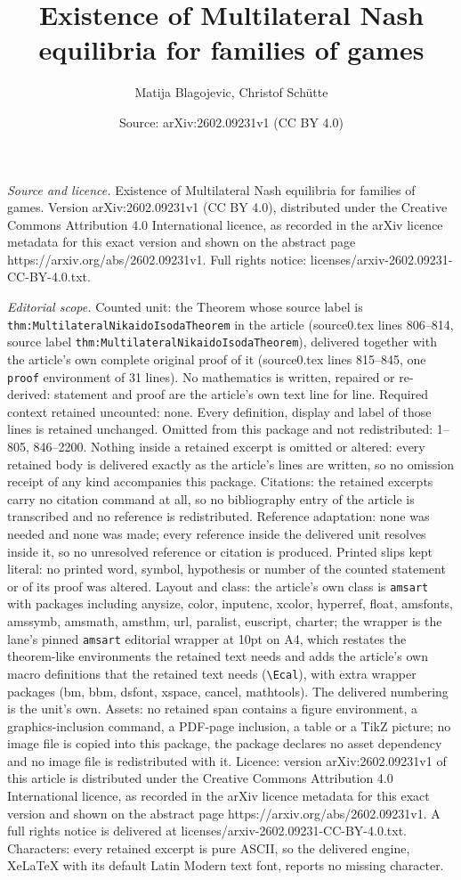 \documentclass[10pt,a4paper]{amsart}
\title[Existence of Multilateral Nash equilibria for families of ga]{Existence of Multilateral Nash equilibria for families of games}
\author{Matija Blagojevic, Christof Sch\"utte}
\date{Source: arXiv:2602.09231v1 (CC BY 4.0)}
\begin{document}
\maketitle

\noindent\emph{Source and licence.} Existence of Multilateral Nash equilibria for families of games. Version arXiv:2602.09231v1 (CC BY 4.0), distributed under the Creative Commons Attribution 4.0 International licence, as recorded in the arXiv licence metadata for this exact version and shown on the abstract page https://arxiv.org/abs/2602.09231v1. Full rights notice: licenses/arxiv-2602.09231-CC-BY-4.0.txt.\par\smallskip

\noindent\textit{Editorial scope.} Counted unit: the Theorem whose source label is \texttt{thm:MultilateralNikaidoIsodaTheorem} in the article (source0.tex lines 806--814, source label \texttt{thm:MultilateralNikaidoIsodaTheorem}), delivered together with the article's own complete original proof of it (source0.tex lines 815--845, one \texttt{proof} environment of 31 lines). No mathematics is written, repaired or re-derived: statement and proof are the article's own text line for line. Required context retained uncounted: none. Every definition, display and label of those lines is retained unchanged. Omitted from this package and not redistributed: 1--805, 846--2200. Nothing inside a retained excerpt is omitted or altered: every retained body is delivered exactly as the article's lines are written, so no omission receipt of any kind accompanies this package. Citations: the retained excerpts carry no citation command at all, so no bibliography entry of the article is transcribed and no reference is redistributed. Reference adaptation: none was needed and none was made; every reference inside the delivered unit resolves inside it, so no unresolved reference or citation is produced. Printed slips kept literal: no printed word, symbol, hypothesis or number of the counted statement or of its proof was altered. Layout and class: the article's own class is \texttt{amsart} with packages including anysize, color, inputenc, xcolor, hyperref, float, amsfonts, amssymb, amsmath, amsthm, url, paralist, euscript, charter; the wrapper is the lane's pinned \texttt{amsart} editorial wrapper at 10pt on A4, which restates the theorem-like environments the retained text needs and adds the article's own macro definitions that the retained text needs (\texttt{\textbackslash Ecal}), with extra wrapper packages (bm, bbm, dsfont, xspace, cancel, mathtools). The delivered numbering is the unit's own. Assets: no retained span contains a figure environment, a graphics-inclusion command, a PDF-page inclusion, a table or a TikZ picture; no image file is copied into this package, the package declares no asset dependency and no image file is redistributed with it. Licence: version arXiv:2602.09231v1 of this article is distributed under the Creative Commons Attribution 4.0 International licence, as recorded in the arXiv licence metadata for this exact version and shown on the abstract page https://arxiv.org/abs/2602.09231v1. A full rights notice is delivered at licenses/arxiv-2602.09231-CC-BY-4.0.txt. Characters: every retained excerpt is pure ASCII, so the delivered engine, XeLaTeX with its default Latin Modern text font, reports no missing character.
\end{document}
